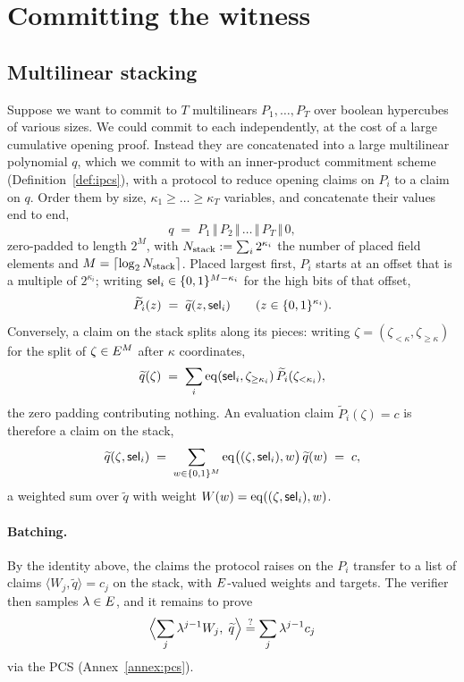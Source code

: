 \section{Committing the witness}\label{sec:rs}

\subsection{Multilinear stacking}\label{sec:stacking}

Suppose we want to commit to $T$ multilinears $P_1,\dots,P_T$ over boolean hypercubes of various sizes. We could commit to each independently, at the cost of a large cumulative opening proof. Instead they are concatenated into a large multilinear polynomial $q$, which we commit to with an inner-product commitment scheme (Definition~\ref{def:ipcs}), with a protocol to reduce opening claims on $P_i$ to a claim on $q$. Order them by size, $\kappa_1\ge\dots\ge\kappa_T$ variables, and concatenate their values end to end,
\[
  q \;=\; P_1 \,\Vert\, P_2 \,\Vert\,\dots\,\Vert\, P_T \,\Vert\, 0,
\]
zero-padded to length $2^{M}$, with $N_{\mathrm{stack}}:=\textstyle\sum_i 2^{\kappa_i}$ the number of placed field elements and $M=\lceil\log_2N_{\mathrm{stack}}\rceil$. Placed largest first, $P_i$ starts at an offset that is a multiple of $2^{\kappa_i}$; writing $\mathsf{sel}_i\in\{0,1\}^{M-\kappa_i}$ for the high bits of that offset,
\[
  \widetilde P_i(z)\;=\;\widetilde q(z,\mathsf{sel}_i)\qquad(z\in\{0,1\}^{\kappa_i}).
\]
Conversely, a claim on the stack splits along its pieces: writing $\zeta=(\zeta_{<\kappa},\zeta_{\ge\kappa})$ for the split of $\zeta\in E^{M}$ after $\kappa$ coordinates,
\begin{equation}\label{eq:stack-split}
  \widetilde q(\zeta)\;=\;\sum_i\operatorname{eq}(\mathsf{sel}_i,\zeta_{\ge\kappa_i})\,\widetilde P_i(\zeta_{<\kappa_i}),
\end{equation}
the zero padding contributing nothing. An evaluation claim $\widetilde P_i(\zeta)=c$ is therefore a claim on the stack,
\[
  \widetilde q(\zeta,\mathsf{sel}_i)\;=\;\sum_{w\in\{0,1\}^{M}}\operatorname{eq}\bigl((\zeta,\mathsf{sel}_i),w\bigr)\,\widetilde q(w)\;=\;c,
\]
a weighted sum over $\widetilde q$ with weight $W(w)=\operatorname{eq}((\zeta,\mathsf{sel}_i),w)$.

\paragraph{Batching.} By the identity above, the claims the protocol raises on the $P_i$ transfer to a list of claims $\langle W_j,\widetilde q\rangle=c_j$ on the stack, with $E$-valued weights and targets. The verifier then samples $\lambda\in E$, and it remains to prove
\[
  \Bigl\langle \sum_j\lambda^{j-1}W_j,\;\widetilde q\Bigr\rangle\stackrel{?}{=}\sum_j\lambda^{j-1}c_j
\]
via the PCS (Annex~\ref{annex:pcs}).

